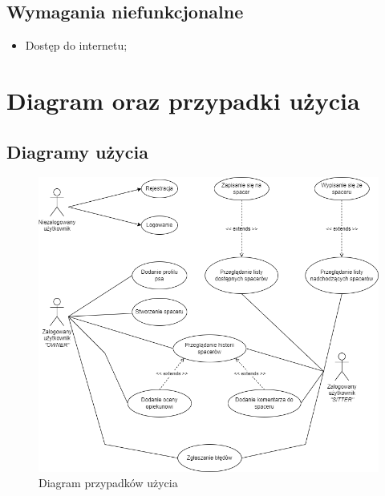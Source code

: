 \subsection{Wymagania niefunkcjonalne}
\begin{itemize}
    \item Dostęp do internetu;
\end{itemize}
\newpage
\section{Diagram oraz przypadki użycia}
\subsection{Diagramy użycia}
\begin{figure}[h]
    \centering
    \includegraphics[width=0.7\linewidth]{rysunki/use-case.png}
    \caption{Diagram przypadków użycia}
    \label{fig:use-case-diagram}
\end{figure}    

